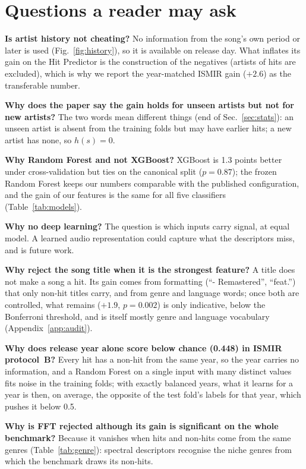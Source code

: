 \FloatBarrier
\section{Questions a reader may ask}\label{app:faq}

\textbf{Is artist history not cheating?} No information from the song's own period or later is used
(Fig.~\ref{fig:history}), so it is available on release day. What inflates its gain on the Hit Predictor
is the construction of the negatives (artists of hits are excluded), which is why we report the
year-matched ISMIR gain ($+2.6$\pp) as the transferable number.

\textbf{Why does the paper say the gain holds for unseen artists but not for new artists?} The two words
mean different things (end of Sec.~\ref{sec:stats}): an unseen artist is absent from the training folds but may
have earlier hits; a new artist has none, so $h(s)=0$.

\textbf{Why Random Forest and not XGBoost?} XGBoost is 1.3 points better under cross-validation but ties
on the canonical split ($p=0.87$); the frozen Random Forest keeps our numbers comparable with the published
configuration, and the gain of our features is the same for all five classifiers (Table~\ref{tab:models}).

\textbf{Why no deep learning?} The question is which inputs carry signal, at equal model. A learned audio
representation could capture what the descriptors miss, and is future work.

\textbf{Why reject the song title when it is the strongest feature?} A title does not make a song a hit.
Its gain comes from formatting (``- Remastered'', ``feat.'') that only non-hit titles carry, and from genre and
language words; once both are controlled, what remains ($+1.9$\pp, $p=0.002$) is only indicative, below the Bonferroni threshold,
and is itself mostly genre and language vocabulary (Appendix~\ref{app:audit}).

\textbf{Why does release year alone score below chance (0.448) in ISMIR protocol~B?} Every hit has a
non-hit from the same year, so the year carries no information, and a Random Forest on a single input with
many distinct values fits noise in the training folds; with exactly balanced years, what it learns for a
year is then, on average, the opposite of the test fold's labels for that year, which pushes it below 0.5.

\textbf{Why is FFT rejected although its gain is significant on the whole benchmark?} Because it vanishes
when hits and non-hits come from the same genres (Table~\ref{tab:genre}): spectral descriptors recognise the
niche genres from which the benchmark draws its non-hits.

